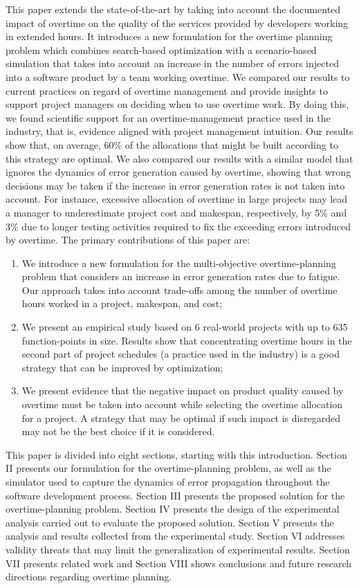 \documentclass[conference]{IEEEtran}
\begin{document}
This paper extends the state-of-the-art by taking into account the documented impact of overtime on the quality of the services provided by developers working in extended hours. It introduces a new formulation for the overtime planning problem which combines search-based optimization with a scenario-based simulation that takes into account an increase in the number of errors injected into a software product by a team working overtime. We compared our results to current practices on regard of overtime management and provide insights to support project managers on deciding when to use overtime work. By doing this, we found scientific support for an overtime-management practice used in the industry, that is, evidence aligned with project management intuition. Our results show that, on average, 60\% of the allocations that might be built according to this strategy are optimal. We also compared our results with a similar model that ignores the dynamics of error generation caused by overtime,  showing that wrong decisions may be taken if the increase in error generation rates is not taken into account. For instance, excessive allocation of overtime in large projects may lead a manager to underestimate project cost and makespan, respectively, by 5\% and 3\% due to longer testing activities required to fix the exceeding errors introduced by overtime. The primary contributions of this paper are:
\begin{enumerate}
\item We introduce a new formulation for the multi-objective overtime-planning problem that considers an increase in error generation rates due to fatigue. Our approach takes into account trade-offs among the number of overtime hours worked in a project, makespan, and cost;

\item We present an empirical study based on 6 real-world projects with up to 635 function-points in size. Results show that concentrating overtime hours in the second part of project schedules (a practice used in the industry) is a good strategy that can be improved by optimization;
\item We present evidence that the negative impact on product quality caused by overtime must be taken into account while selecting the overtime allocation for a project. A strategy that may be optimal if such impact is disregarded may not be the best choice if it is considered.
\end{enumerate}

This paper is divided into eight sections, starting with this introduction. Section II presents our formulation for the overtime-planning problem, as well as the simulator used to capture the dynamics of error propagation throughout the software development process. Section III presents the proposed solution for the overtime-planning problem. Section IV presents the design of the experimental analysis carried out to evaluate the proposed solution. Section V presents the analysis and results collected from the experimental study. Section VI addresses validity threats that may limit the generalization of experimental results. Section VII presents related work and Section VIII shows conclusions and future research directions regarding overtime planning.
\end{document}
